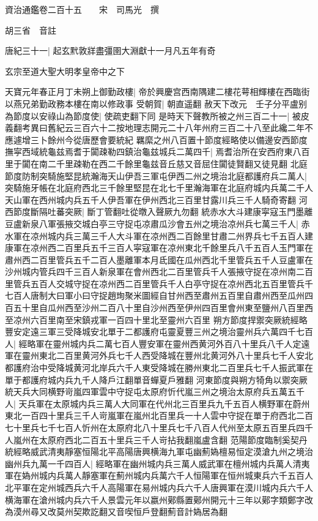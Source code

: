 資治通鑑卷二百十五　　宋　司馬光　撰

胡三省　音註

唐紀三十一|{
	起玄黓敦牂盡彊圉大淵獻十一月凡五年有奇}


玄宗至道大聖大明孝皇帝中之下

天寶元年春正月丁未朔上御勤政樓|{
	帝於興慶宫西南隅建二樓花萼相輝樓在西臨街以燕兄弟勤政務本樓在南以修政事}
受朝賀|{
	朝直遥翻}
赦天下改元　壬子分平盧别為節度以安祿山為節度使|{
	使疏吏翻下同}
是時天下聲教所被之州三百二十一|{
	被皮義翻考異曰舊紀云三百六十二按地理志開元二十八年州府三百二十八至此纔二年不應遽增三卜餘州今從唐歷會要統紀}
羈縻之州八百置十節度經略使以備邊安西節度撫寜西域統龜兹焉耆于闐疎勒四鎮治龜兹城兵二萬四千|{
	焉耆治所在安西府東八百里于闐在南二千里疎勒在西二千餘里龜兹音丘慈又音屈住闐徒賢翻又徒見翻}
北庭節度防制突騎施堅昆統瀚海天山伊吾三軍屯伊西二州之境治北庭都護府兵二萬人|{
	突騎施牙帳在北庭府西北三千餘里堅昆在北七千里瀚海軍在北庭府城内兵萬二千人天山軍在西州城内兵五千人伊吾軍在伊州西北三百里甘露川兵三千人騎奇寄翻}
河西節度斷隔吐蕃突厥|{
	斷丁管翻吐從暾入聲厥九勿翻}
統赤水大斗建康寜寇玉門墨離豆盧新泉八軍張掖交城白亭三守捉屯凉肅瓜沙會五州之境治凉州兵七萬三千人|{
	赤水軍在凉州城内兵三萬三千人大斗軍在凉州西二百餘里甘肅二州界兵七千五百人建康軍在凉州西二百里兵五千三百人寜寇軍在凉州東北千餘里兵八千五百人玉門軍在肅州西二百里管兵五千二百人墨離軍本月氐國在瓜州西北千里管兵五千人豆盧軍在沙州城内管兵四千三百人新泉軍在會州西北二百里管兵千人張掖守捉在凉州南二百里管兵五百人交城守捉在凉州西二百里管兵千人白亭守捉在凉州西北五百里管兵千七百人唐制大曰軍小曰守捉趙珣聚米圖經自甘州西至肅州五百里自肅州西至瓜州四百五十里自瓜州西至沙州二百八十里自沙州西至伊州四百里會州東至鹽州八百里西至凉州六百里南至宋鎮戎軍一百四十里北至靈州六百里}
朔方節度捍禦突厥統經略豐安定遠三軍三受降城安北單于二都護府屯靈夏豐三州之境治靈州兵六萬四千七百人|{
	經略軍在靈州城内兵二萬七百人豐安軍在靈州西黄河外百八十里兵八千人定遠軍在靈州東北二百里黄河外兵七千人西受降城在豐州北黄河外八十里兵七千人安北都護府治中受降城黄河北岸兵六千人東受降城在勝州東北二百里兵七千人振武軍在單于都護府城内兵九千人降戶江翻單音蟬夏戶雅翻}
河東節度與朔方犄角以禦突厥統天兵大同横野岢嵐四軍雲中守捉屯太原府忻代嵐三州之境治太原府兵五萬五千人|{
	天兵軍在太原城内兵三萬人大同軍在代州北三百里兵九千五百人横野軍在蔚州東北一百四十里兵三千人岢嵐軍在嵐州北百里兵一十人雲中守捉在單于府西北二百七十里兵七千七百人忻州在太原府北八十里兵七千八百人代州至太原五百里兵四千人嵐州在太原府西北二百五十里兵三千人岢拈我翻嵐盧含翻}
范陽節度臨制奚契丹統經略威武清夷靜塞恒陽北平高陽唐興横海九軍屯幽薊媯檀易恒定漠滄九州之境治幽州兵九萬一千四百人|{
	經略軍在幽州城内兵三萬人威武軍在檀州城内兵萬人清夷軍在媯州城内兵萬人靜塞軍在薊州城内兵萬六千人恒陽軍在恒州城東兵六千五百人北平軍在定州城西兵六千人高陽軍在易州城内兵六千人唐興軍在漠川城内兵六千人横海軍在滄州城内兵六千人景雲元年以嬴州鄚縣置鄚州開元十三年以鄚字類鄭字改為漠州尋又改莫州契欺訖翻又音喫恒戶登翻薊音計媯居為翻}
